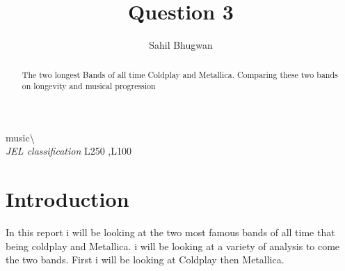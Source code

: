 \documentclass[12pt,preprint, authoryear]{elsarticle}
\numberwithin{equation}{section}
\numberwithin{figure}{section}
\numberwithin{table}{section}
\begin{document}
\begin{frontmatter}  %

\title{Question 3}





\author[Add1]{Sahil Bhugwan}





\address[Add1]{Github- \url{https://github.com/SBhugwan}}


\begin{abstract}
\small{
The two longest Bands of all time Coldplay and Metallica. Comparing
these two bands on longevity and musical progression
}
\end{abstract}

\vspace{1cm}


\begin{keyword}
\footnotesize{
music\textbackslash{} \\
\vspace{0.3cm}
}
\footnotesize{
\textit{JEL classification} L250 \sep L100
}
\end{keyword}



\vspace{0.5cm}

\end{frontmatter}



\pagestyle{fancy}
\chead{}
\rhead{}
\lfoot{}
\lhead{}
\cfoot{}


\headsep 35pt %




\hypertarget{introduction}{%
\section{\texorpdfstring{Introduction
\label{Introduction}}{Introduction }}\label{introduction}}

In this report i will be looking at the two most famous bands of all
time that being coldplay and Metallica. i will be looking at a variety
of analysis to come the two bands. First i will be looking at Coldplay
then Metallica.
\end{document}
